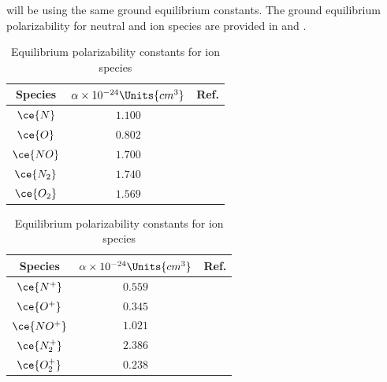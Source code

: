  will be using the same ground
equilibrium constants. The
ground equilibrium polarizability for neutral and ion species are provided in  and .
       \begin{table}[H]
           \begin{minipage}[b]{0.49\textwidth}
            \centering
                \begin{tabular}{| c | c | c |}
                    \hline 
                    Species  & $\alpha \times 10^{-24}\Units{cm^3}$ & Ref.             \\
                    \hline \hline 
                    $\ce{N}$        & $1.100$                               &\cite{Haynes2004}\\
                    $\ce{O}$        & $0.802$                               &\cite{Haynes2004}\\
                    $\ce{NO}$       & $1.700$                               &\cite{Haynes2004}\\
                    $\ce{N_2}$      & $1.740$                               &\cite{Haynes2004}\\
                    $\ce{O_2}$      & $1.569$                               &\cite{Haynes2004}\\
                    \hline 
                \end{tabular} 
            \caption{Equilibrium polarizability constants for neutral species\label{tab:equilibriumPolarizabilityNeutralSpecies}}
            \end{minipage} \hfill
           \begin{minipage}[b]{0.49\textwidth}
               \centering
                \begin{tabular}{| c | c | c |}
                    \hline
                    Species  & $\alpha \times 10^{-24}\Units{cm^3}$ & Ref.             \\
                    \hline\hline
                    $\ce{N^+}$   & $0.559$                               &\cite{Jacobson1996}\\
                    $\ce{O^+}$   & $0.345$                               &\cite{Stewart1975}\\
                    $\ce{NO^+}$  & $1.021$                               &\cite{Feher1993}\\
                    $\ce{N_2^+}$ & $2.386$                               &\cite{McCormack1991}\\
                    $\ce{O_2^+}$ & $0.238$                               &\cite{Stewart1975}\\
                    \hline 
                \end{tabular}
                \caption{Equilibrium polarizability constants for ion species\label{tab:equilibriumPolarizabilityIonSpecies}}
           \end{minipage}
    \end{table}
